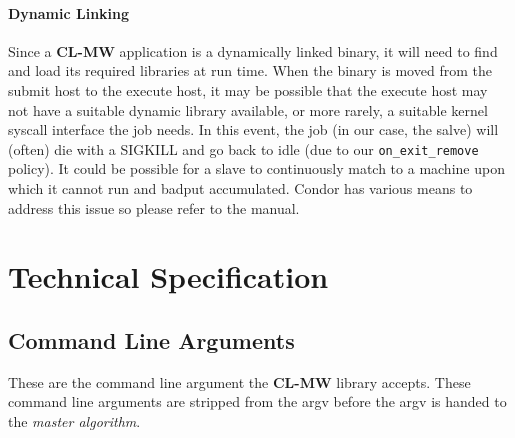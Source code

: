 \documentclass[titlepage,12pt]{book}
\newcommand{\xsmall}{\latexhtml{\small}{}}
\newcommand{\xnormalsize}{\latexhtml{\normalsize}{}}
\newcommand{\clmw}{\xsmall\textbf{CL-MW}\xnormalsize\xspace}
\newcommand{\ma}{\textit{master algorithm}\xspace}
\begin{document}
\subsubsection{Dynamic Linking}

Since a \clmw application is a dynamically linked binary, it
will need to find and load its required libraries at run time.
When the binary is moved from the submit host to the execute host,
it may be possible that the execute host may not have a suitable
dynamic library available, or more rarely, a suitable kernel syscall
interface the job needs. In this event, the job (in our case, the
salve) will (often) die with a SIGKILL and go back to idle (due to
our \texttt{on\_exit\_remove} policy). It could be possible for a
slave to continuously match to a machine upon which it cannot run and
badput accumulated. Condor has various means to address this issue
so please refer to the manual.

\chapter{Technical Specification}

\section{Command Line Arguments}
\label{command-line-arguments}

These are the command line argument the \clmw library accepts. These
command line arguments are stripped from the argv before the argv is
handed to the \ma.
\end{document}
